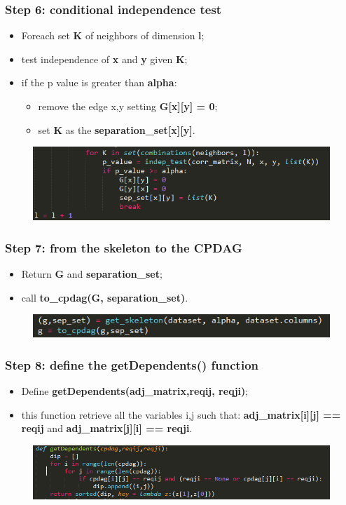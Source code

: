 \documentclass[xcolor ={table,usenames,dvipsnames}]{beamer}
\theoremstyle{definition}
\begin{document}
\begin{frame}
\frametitle{Step 6: conditional independence test}
\begin{itemize}
	\item Foreach set \textbf{K} of neighbors of dimension \textbf{l};
	\item test independence of \textbf{x} and \textbf{y} given \textbf{K};
	\item if the p value is greater than \textbf{alpha}:
	\begin{itemize}
		\item remove the edge x,y setting \textbf{G[x][y] = 0};
		\item set \textbf{K} as the \textbf{separation\_set[x][y]}.
	\end{itemize}
\end{itemize}
	\begin{figure}[h!]
		\centering
		\includegraphics[scale=0.6]{img/indeptest.PNG}
	\end{figure}
\end{frame}
\begin{frame}
\frametitle{Step 7: from the skeleton to the CPDAG}
\begin{itemize}
	\item Return \textbf{G} and \textbf{separation\_set};
	\item call \textbf{to\_cpdag(G, separation\_set)}.
\end{itemize}
	\begin{figure}[h!]
		\centering
		\includegraphics[scale=0.75]{img/tocpdag.PNG}
	\end{figure}
\end{frame}

\begin{frame}
\frametitle{Step 8: define the getDependents() function}
\begin{itemize}
	\item Define \textbf{getDependents(adj\_matrix,reqij, reqji)};
	\item this function retrieve all the variables i,j such that: \textbf{adj\_matrix[i][j] == reqij} and \textbf{adj\_matrix[j][i] == reqji}.
\end{itemize}
	\begin{figure}[h!]
		\centering
		\includegraphics[scale=0.57]{img/getindep.PNG}
	\end{figure}
\end{frame}
\end{document}
